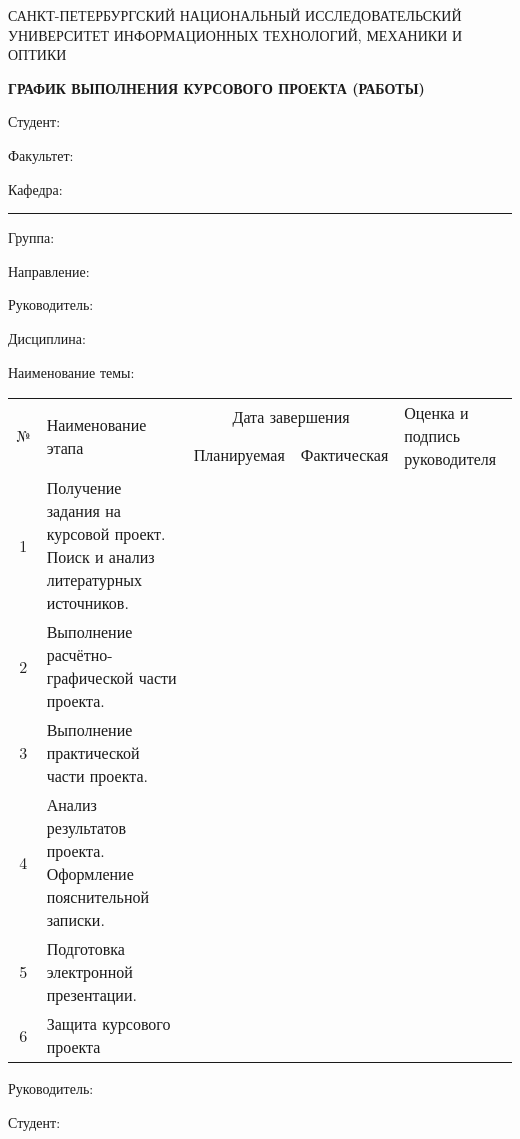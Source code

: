 \thispagestyle{empty}


\begin{center}
{\small САНКТ-ПЕТЕРБУРГСКИЙ НАЦИОНАЛЬНЫЙ ИССЛЕДОВАТЕЛЬСКИЙ УНИВЕРСИТЕТ ИНФОРМАЦИОННЫХ ТЕХНОЛОГИЙ, МЕХАНИКИ И ОПТИКИ}

\textbf{ГРАФИК ВЫПОЛНЕНИЯ КУРСОВОГО ПРОЕКТА (РАБОТЫ)}
\end{center}

Студент:  

Факультет: 

Кафедра: \rule{10em}{.1pt} Группа: 

Направление:  

Руководитель: 

Дисциплина: 

\hrulefill

Наименование темы: 

\hrulefill

\begin{table}[h!]
	\centering
		\begin{tabular}{|c|p{5cm}|c|c|p{3cm}|}
			\hline
			\multirow{2}{*}{№} & \multirow{2}{*}{Наименование этапа} & \multicolumn{2}{c|}{Дата завершения} & \multirow{2}{*}{\parbox{3cm}{Оценка и подпись руководителя}} \\ \cline{3-4}
			&                                     & Планируемая       & Фактическая      &                                                \\ \hline
			1                  & Получение задания на курсовой проект. Поиск и анализ литературных источников.                                    &                   &                  &                                                \\ \hline
			2                  & Выполнение расчётно-графической части проекта.                                     &                   &                  &                                                \\ \hline
			3                  & Выполнение практической части проекта.                                     &                   &                  &                                                \\ \hline
			4                  & Анализ результатов проекта. Оформление пояснительной записки.                                     &                   &                  &                                                \\ \hline
			5                  & Подготовка электронной презентации.                                     &                   &                  &                                                \\ \hline
			6                  & Защита курсового проекта                                     &                   &                  &                                                \\ \hline												
		\end{tabular}
\end{table}

\vfill


Руководитель: \hrulefill

Студент: \hrulefill
